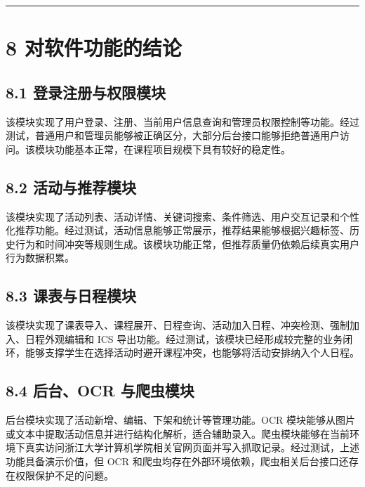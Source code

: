\begin{center}\rule{0.5\linewidth}{0.5pt}\end{center}

\section{8
对软件功能的结论}\label{ux5bf9ux8f6fux4ef6ux529fux80fdux7684ux7ed3ux8bba}

\subsection{8.1
登录注册与权限模块}\label{ux767bux5f55ux6ce8ux518cux4e0eux6743ux9650ux6a21ux5757-1}

该模块实现了用户登录、注册、当前用户信息查询和管理员权限控制等功能。经过测试，普通用户和管理员能够被正确区分，大部分后台接口能够拒绝普通用户访问。该模块功能基本正常，在课程项目规模下具有较好的稳定性。

\subsection{8.2
活动与推荐模块}\label{ux6d3bux52a8ux4e0eux63a8ux8350ux6a21ux5757}

该模块实现了活动列表、活动详情、关键词搜索、条件筛选、用户交互记录和个性化推荐功能。经过测试，活动信息能够正常展示，推荐结果能够根据兴趣标签、历史行为和时间冲突等规则生成。该模块功能正常，但推荐质量仍依赖后续真实用户行为数据积累。

\subsection{8.3
课表与日程模块}\label{ux8bfeux8868ux4e0eux65e5ux7a0bux6a21ux5757}

该模块实现了课表导入、课程展开、日程查询、活动加入日程、冲突检测、强制加入、日程外观编辑和
ICS
导出功能。经过测试，该模块已经形成较完整的业务闭环，能够支撑学生在选择活动时避开课程冲突，也能够将活动安排纳入个人日程。

\subsection{8.4 后台、OCR
与爬虫模块}\label{ux540eux53f0ocr-ux4e0eux722cux866bux6a21ux5757}

后台模块实现了活动新增、编辑、下架和统计等管理功能。OCR
模块能够从图片或文本中提取活动信息并进行结构化解析，适合辅助录入。爬虫模块能够在当前环境下真实访问浙江大学计算机学院相关官网页面并写入抓取记录。经过测试，上述功能具备演示价值，但
OCR 和爬虫均存在外部环境依赖，爬虫相关后台接口还存在权限保护不足的问题。

